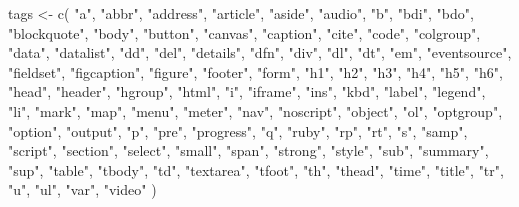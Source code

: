 \documentclass[
]{krantz}
\makeatletter
\newenvironment{Shaded}{\begin{snugshade}}{\end{snugshade}}
\newcommand{\KeywordTok}[1]{\textcolor[rgb]{0.13,0.29,0.53}{\textbf{#1}}}
\newcommand{\NormalTok}[1]{#1}
\newcommand{\StringTok}[1]{\textcolor[rgb]{0.31,0.60,0.02}{#1}}
\newenvironment{kframe}{%
\medskip{}
\setlength{\fboxsep}{.8em}
 \def\at@end@of@kframe{}%
 \ifinner\ifhmode%
  \def\at@end@of@kframe{\end{minipage}}%
  \begin{minipage}{\columnwidth}%
 \fi\fi%
 \def\FrameCommand##1{\hskip\@totalleftmargin \hskip-\fboxsep
 \colorbox{shadecolor}{##1}\hskip-\fboxsep
     \hskip-\linewidth \hskip-\@totalleftmargin \hskip\columnwidth}%
 \MakeFramed {\advance\hsize-\width
   \@totalleftmargin\z@ \linewidth\hsize
   \@setminipage}}%
 {\par\unskip\endMakeFramed%
 \at@end@of@kframe}
\renewenvironment{Shaded}{\begin{kframe}}{\end{kframe}}
\renewcommand{\KeywordTok} [1]{\textcolor[rgb]{0.00,0.44,0.13}{{#1}}}
\renewcommand{\StringTok}  [1]{\textcolor[rgb]{0.25,0.44,0.63}{{#1}}}
\renewcommand{\NormalTok}  [1]{{#1}}
\makeatother
\begin{document}
\begin{Shaded}
\begin{Highlighting}[]
\NormalTok{tags <-}\StringTok{ }\KeywordTok{c}\NormalTok{(}
  \StringTok{"a"}\NormalTok{, }\StringTok{"abbr"}\NormalTok{, }\StringTok{"address"}\NormalTok{, }\StringTok{"article"}\NormalTok{, }\StringTok{"aside"}\NormalTok{, }\StringTok{"audio"}\NormalTok{, }\StringTok{"b"}\NormalTok{,}
  \StringTok{"bdi"}\NormalTok{, }\StringTok{"bdo"}\NormalTok{, }\StringTok{"blockquote"}\NormalTok{, }\StringTok{"body"}\NormalTok{, }\StringTok{"button"}\NormalTok{, }\StringTok{"canvas"}\NormalTok{,}
  \StringTok{"caption"}\NormalTok{, }\StringTok{"cite"}\NormalTok{, }\StringTok{"code"}\NormalTok{, }\StringTok{"colgroup"}\NormalTok{, }\StringTok{"data"}\NormalTok{, }\StringTok{"datalist"}\NormalTok{,}
  \StringTok{"dd"}\NormalTok{, }\StringTok{"del"}\NormalTok{, }\StringTok{"details"}\NormalTok{, }\StringTok{"dfn"}\NormalTok{, }\StringTok{"div"}\NormalTok{, }\StringTok{"dl"}\NormalTok{, }\StringTok{"dt"}\NormalTok{, }\StringTok{"em"}\NormalTok{,}
  \StringTok{"eventsource"}\NormalTok{, }\StringTok{"fieldset"}\NormalTok{, }\StringTok{"figcaption"}\NormalTok{, }\StringTok{"figure"}\NormalTok{, }\StringTok{"footer"}\NormalTok{,}
  \StringTok{"form"}\NormalTok{, }\StringTok{"h1"}\NormalTok{, }\StringTok{"h2"}\NormalTok{, }\StringTok{"h3"}\NormalTok{, }\StringTok{"h4"}\NormalTok{, }\StringTok{"h5"}\NormalTok{, }\StringTok{"h6"}\NormalTok{, }\StringTok{"head"}\NormalTok{, }\StringTok{"header"}\NormalTok{,}
  \StringTok{"hgroup"}\NormalTok{, }\StringTok{"html"}\NormalTok{, }\StringTok{"i"}\NormalTok{, }\StringTok{"iframe"}\NormalTok{, }\StringTok{"ins"}\NormalTok{, }\StringTok{"kbd"}\NormalTok{, }\StringTok{"label"}\NormalTok{, }\StringTok{"legend"}\NormalTok{,}
  \StringTok{"li"}\NormalTok{, }\StringTok{"mark"}\NormalTok{, }\StringTok{"map"}\NormalTok{, }\StringTok{"menu"}\NormalTok{, }\StringTok{"meter"}\NormalTok{, }\StringTok{"nav"}\NormalTok{, }\StringTok{"noscript"}\NormalTok{, }\StringTok{"object"}\NormalTok{,}
  \StringTok{"ol"}\NormalTok{, }\StringTok{"optgroup"}\NormalTok{, }\StringTok{"option"}\NormalTok{, }\StringTok{"output"}\NormalTok{, }\StringTok{"p"}\NormalTok{, }\StringTok{"pre"}\NormalTok{, }\StringTok{"progress"}\NormalTok{, }\StringTok{"q"}\NormalTok{,}
  \StringTok{"ruby"}\NormalTok{, }\StringTok{"rp"}\NormalTok{, }\StringTok{"rt"}\NormalTok{, }\StringTok{"s"}\NormalTok{, }\StringTok{"samp"}\NormalTok{, }\StringTok{"script"}\NormalTok{, }\StringTok{"section"}\NormalTok{, }\StringTok{"select"}\NormalTok{,}
  \StringTok{"small"}\NormalTok{, }\StringTok{"span"}\NormalTok{, }\StringTok{"strong"}\NormalTok{, }\StringTok{"style"}\NormalTok{, }\StringTok{"sub"}\NormalTok{, }\StringTok{"summary"}\NormalTok{, }\StringTok{"sup"}\NormalTok{,}
  \StringTok{"table"}\NormalTok{, }\StringTok{"tbody"}\NormalTok{, }\StringTok{"td"}\NormalTok{, }\StringTok{"textarea"}\NormalTok{, }\StringTok{"tfoot"}\NormalTok{, }\StringTok{"th"}\NormalTok{, }\StringTok{"thead"}\NormalTok{,}
  \StringTok{"time"}\NormalTok{, }\StringTok{"title"}\NormalTok{, }\StringTok{"tr"}\NormalTok{, }\StringTok{"u"}\NormalTok{, }\StringTok{"ul"}\NormalTok{, }\StringTok{"var"}\NormalTok{, }\StringTok{"video"}
\NormalTok{)}


\end{Highlighting}
\end{Shaded}
\end{document}

